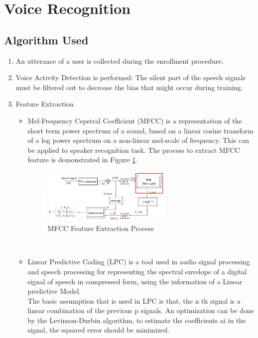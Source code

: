 
\section{Voice Recognition}

\subsection{Algorithm Used}
\begin{enumerate}
  \item An utterance of a user is collected during the enrollment procedure.
  \item Voice Activity Detection is performed: The silent part of the speech signals must be filtered out to decrease the bias that might occur during training.
  \item Feature Extraction
    \begin{itemize}
      \item Mel-Frequency Cepstral Coefficient (MFCC) is a representation of the short term power spectrum of a sound, based on a linear cosine transform of a log power spectrum on a non-linear mel-scale of frequency. This can be applied to speaker recognition task. The process to extract MFCC feature is demonstrated in Figure \ref{fig:MFCC_fig_one}. \\
      \begin{figure}[!t]
      \centering
      \includegraphics[width=2.5in]{./MFCC-mel-filterbank.png}
      \caption{MFCC Feature Extraction Process}
      \label{fig:MFCC_fig_one}
      \end{figure}
      \\
      \item Linear Predictive Coding (LPC) is a tool used in audio signal processing and speech processing for representing the spectral envelope of a digital signal of speech in compressed form, using the information of a Linear predictive Model. \\
      The basic  assumption that is used in LPC is that, the n th signal is a linear combination of the previous p signals. An optimization can be done by the Levinson-Durbin algorithm, to estimate the coefficients ai in the signal, the squared error should be minimized.
    \end{itemize}
    

\end{enumerate}
